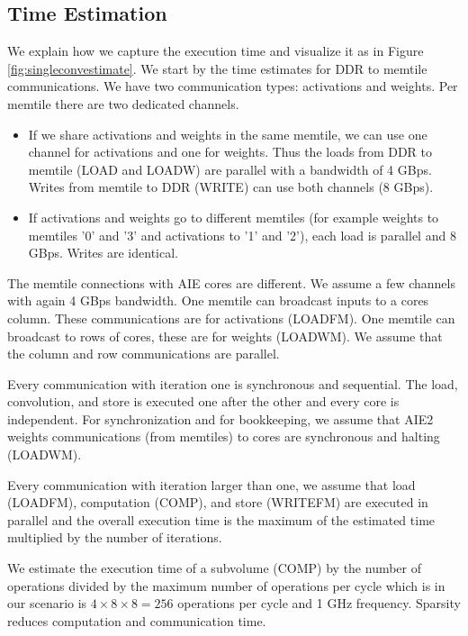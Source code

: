 \documentclass{IEEEtran}
\begin{document}
\subsection{Time Estimation}
We explain how we capture the execution time and visualize it as in
Figure \ref{fig:singleconvestimate}. We start by the time estimates
for DDR to memtile communications. We have two communication types:
activations and weights. Per memtile there are two dedicated channels.
\begin{itemize}
 \item If we share activations and weights in the same memtile, we can
   use one channel for activations and one for weights. Thus the loads
   from DDR to memtile (LOAD and LOADW) are parallel with a bandwidth
   of 4 GBps. Writes from memtile to DDR (WRITE) can use both channels
   (8 GBps).

 \item If activations and weights go to different memtiles (for
   example weights to memtiles '0' and '3' and activations to '1' and
   '2'), each load is parallel and 8 GBps. Writes are identical.
\end{itemize}
   
The memtile connections with AIE cores are different. We assume a few
channels with again 4 GBps bandwidth. One memtile can broadcast inputs
to a cores column. These communications are for activations
(LOADFM). One memtile can broadcast to rows of cores, these are for
weights (LOADWM). We assume that the column and row communications are
parallel.

Every communication with iteration one is synchronous and sequential.
The load, convolution, and store is executed one after the other and
every core is independent.  For synchronization and for bookkeeping,
we assume that AIE2 weights communications (from memtiles) to cores are
synchronous and halting (LOADWM).

Every communication with iteration larger than one, we assume that
load (LOADFM), computation (COMP), and store (WRITEFM) are executed in
parallel and the overall execution time is the maximum of the
estimated time multiplied by the number of iterations.

We estimate the execution time of a subvolume (COMP) by the number of
operations divided by the maximum number of operations per cycle which
is in our scenario is $4\times 8 \times 8 = 256 $ operations per cycle
and 1 GHz frequency. Sparsity reduces computation and communication
time.
\end{document}
